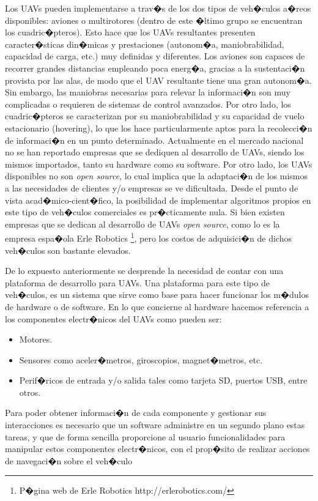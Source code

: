 Los UAVs pueden implementarse a trav�s de los dos tipos de veh�culos a�reos disponibles: aviones o multirotores (dentro de este �ltimo grupo se encuentran los cuadric�pteros). Esto hace que los UAVs resultantes presenten caracter�sticas din�micas y prestaciones (autonom�a, maniobrabilidad, capacidad de carga, etc.) muy definidas y diferentes. Los aviones son capaces de recorrer grandes distancias empleando poca energ�a, gracias a la sustentaci�n provista por las alas, de modo que el UAV resultante tiene una gran autonom�a. Sin embargo, las maniobras necesarias para relevar la informaci�n son muy complicadas o requieren de sistemas de control avanzados. Por otro lado, los
cuadric�pteros se caracterizan por su maniobrabilidad y su capacidad de vuelo estacionario (hovering), lo que los hace particularmente aptos para la recolecci�n de informaci�n en un punto determinado. Actualmente en el mercado nacional no se han reportado empresas que se dediquen al desarrollo de UAVs, siendo los mismos importados, tanto su hardware como su software. Por otro lado, los UAVs disponibles no son \textit{open source}, lo cual implica que la adaptaci�n de
los mismos a las necesidades de clientes y/o empresas se ve dificultada. Desde el punto de vista acad�mico-cient�fico, la posibilidad de implementar algoritmos propios en este tipo de veh�culos comerciales es pr�cticamente nula. Si bien existen empresas que se dedican al desarrollo de UAVs \textit{open source}, como lo es la empresa espa�ola Erle Robotics \footnote{P�gina web de Erle Robotics http://erlerobotics.com/}, pero los costos de adquisici�n de dichos veh�culos son bastante elevados. 
\par De lo expuesto anteriormente se desprende la necesidad de contar con una plataforma de desarrollo para UAVs. Una plataforma para este tipo de veh�culos, es un sistema que sirve como base para hacer funcionar los m�dulos de hardware o de software. En lo que concierne al hardware hacemos referencia a los componentes electr�nicos del UAVs como
pueden ser:
\begin{itemize}
	\item Motores.
	\item Sensores como aceler�metros, giroscopios, magnet�metros, etc.
	\item Perif�ricos de entrada y/o salida tales como tarjeta SD, puertos USB, entre otros.
\end{itemize}

Para poder obtener informaci�n de cada componente y gestionar sus interacciones es necesario que un software administre en un segundo plano estas tareas, y que de forma sencilla proporcione al usuario funcionalidades para manipular estos componentes electr�nicos, con el prop�sito de realizar acciones de navegaci�n sobre el veh�culo

